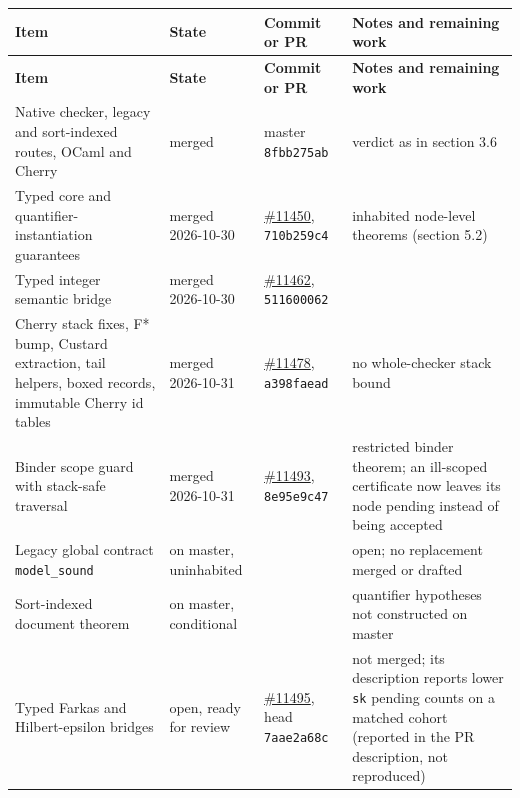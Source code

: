 \documentclass[10pt,a4paper]{article}
\begin{document}
{\footnotesize
\begin{longtable}{>{\raggedright\arraybackslash}p{}>{\raggedright\arraybackslash}p{}>{\raggedright\arraybackslash}p{}>{\raggedright\arraybackslash}p{}}
\toprule
\textbf{Item} & \textbf{State} & \textbf{Commit or PR} & \textbf{Notes and remaining work} \\
\midrule
\endfirsthead
\toprule
\textbf{Item} & \textbf{State} & \textbf{Commit or PR} & \textbf{Notes and remaining work} \\
\midrule
\endhead
\bottomrule
\endlastfoot
Native checker, legacy and sort-indexed routes, OCaml and Cherry & merged & master \texttt{8fbb275ab} & verdict as in section 3.6 \\
Typed core and quantifier-instantiation guarantees & merged 2026-10-30 & \href{https://github.com/Z3Prover/z3/pull/11450}{\#\allowbreak{}11450}, \texttt{710b259c4} & inhabited node-level theorems (section 5.2) \\
Typed integer semantic bridge & merged 2026-10-30 & \href{https://github.com/Z3Prover/z3/pull/11462}{\#\allowbreak{}11462}, \texttt{511600062} &  \\
Cherry stack fixes, F* bump, Custard extraction, tail helpers, boxed records, immutable Cherry id tables & merged 2026-10-31 & \href{https://github.com/Z3Prover/z3/pull/11478}{\#\allowbreak{}11478}, \texttt{a398faead} & no whole-checker stack bound \\
Binder scope guard with stack-safe traversal & merged 2026-10-31 & \href{https://github.com/Z3Prover/z3/pull/11493}{\#\allowbreak{}11493}, \texttt{8e95e9c47} & restricted binder theorem; an ill-scoped certificate now leaves its node pending instead of being accepted \\
Legacy global contract \texttt{model\_\allowbreak{}sound} & on master, uninhabited &  & open; no replacement merged or drafted \\
Sort-indexed document theorem & on master, conditional &  & quantifier hypotheses not constructed on master \\
Typed Farkas and Hilbert-epsilon bridges & open, ready for review & \href{https://github.com/Z3Prover/z3/pull/11495}{\#\allowbreak{}11495}, head \texttt{7aae2a68c} & not merged; its description reports lower \texttt{sk} pending counts on a matched cohort (reported in the PR description, not reproduced) \\

\end{longtable}}
\end{document}
